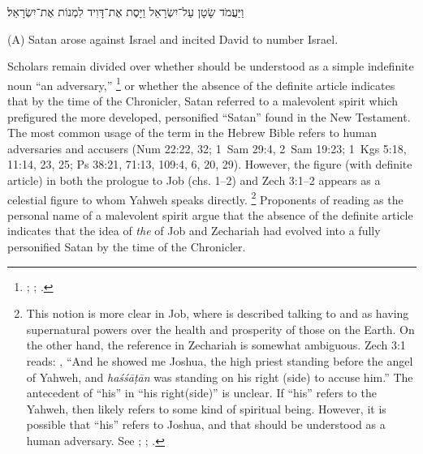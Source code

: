 \begin{hebrewtext}
    {
    וַיַּעֲמֹד שָׂטָן עַל־יִשְׂרָאֵל וַיָּסֶת אֶת־דָּוִיד לִמְנוֹת אֶת־יִשְׂרָאֵל׃
    }
\end{hebrewtext}
\begin{translation}
    (A) Satan arose against Israel and incited David to number Israel.
\end{translation}
\noindent
Scholars remain divided over whether  should be understood as a simple indefinite noun ``an adversary,''%
    \footnote{%
        \cite{stokes_jbl2009};
        \cite[114--117]{japhet2009};
        \cite[370--390]{japhet1993}.}
or whether the absence of the definite article indicates that by the time of the Chronicler, Satan referred to a malevolent spirit which prefigured the more developed, personified ``Satan'' found in the New Testament.%
    \autocite[4--5]{rollston_keith-stuckenbruck2016}
The most common usage of the term  in the Hebrew Bible refers to human adversaries and accusers (Num 22:22, 32; 1~Sam 29:4, 2~Sam 19:23; 1~Kgs 5:18, 11:14, 23, 25; Ps 38:21, 71:13, 109:4, 6, 20, 29). However, the figure  (with definite article) in both the prologue to Job (chs. 1--2) and Zech 3:1--2 appears as a celestial figure to whom Yahweh speaks directly.%
    \footnote{%
        This notion is more clear in Job, where  is described talking to \yahweh and as having supernatural powers over the health and prosperity of those on the Earth. On the other hand, the reference in Zechariah is somewhat ambiguous. Zech 3:1 reads: , ``And he showed me Joshua, the high priest standing before the angel of Yahweh, and \emph{haśśāṭān} was standing on his right (side) to accuse him.'' The antecedent of ``his'' in ``his right(side)'' is unclear. If ``his'' refers to the  Yahweh, then  likely refers to some kind of spiritual being. However, it is possible that ``his'' refers to Joshua, and that  should be understood as a human adversary. See 
        \cite[114--117]{japhet2009};
        \cite[370--390]{japhet1993}; 
        \cite{stokes_jbl2009}.}
Proponents of reading  as the personal name of a malevolent spirit argue that the absence of the definite article indicates that the idea of \emph{the}  of Job and Zechariah had evolved into a fully personified Satan by the time of the Chronicler.%
